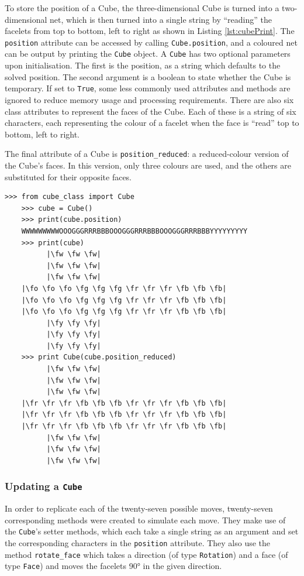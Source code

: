 \documentclass{report}
\newcommand{\fw}{\color{gray}W }
\newcommand{\fo}{\color{orange}O }
\newcommand{\fg}{\color{green}G }
\newcommand{\fr}{\color{red}R }
\newcommand{\fb}{\color{blue}B }
\newcommand{\fy}{\color{yellow}Y }
\begin{document}
    To store the position of a Cube, the three-dimensional Cube is turned into a two-dimensional net, which is then turned into a single string by \enquote{reading} the facelets from top to bottom, left to right as shown in Listing \ref{lst:cubePrint}. The \lstinline|position| attribute can be accessed by calling \lstinline|Cube.position|, and a coloured net can be output by printing the \lstinline|Cube| object. A \lstinline|Cube| has two optional parameters upon initialisation. The first is the position, as a string which defaults to the solved position. The second argument is a boolean to state whether the Cube is temporary. If set to \lstinline|True|, some less commonly used attributes and methods are ignored to reduce memory usage and processing requirements. There are also six class attributes to represent the faces of the Cube. Each of these is a string of six characters, each representing the colour of a facelet when the face is \enquote{read} top to bottom, left to right.
    
    The final attribute of a Cube is \lstinline|position_reduced|: a reduced-colour version of the Cube's faces. In this version, only three colours are used, and the others are substituted for their opposite faces.
    
	\begin{lstlisting}[caption={The two different ways of accessing a Cube's position}, label={lst:cubePrint}]
    >>> from cube_class import Cube
    >>> cube = Cube()
    >>> print(cube.position)
    WWWWWWWWWOOOGGGRRRBBBOOOGGGRRRBBBOOOGGGRRRBBBYYYYYYYYY
    >>> print(cube)
          |\fw \fw \fw|
          |\fw \fw \fw|
          |\fw \fw \fw|
    |\fo \fo \fo \fg \fg \fg \fr \fr \fr \fb \fb \fb|
    |\fo \fo \fo \fg \fg \fg \fr \fr \fr \fb \fb \fb|
    |\fo \fo \fo \fg \fg \fg \fr \fr \fr \fb \fb \fb|
          |\fy \fy \fy|
          |\fy \fy \fy|
          |\fy \fy \fy|
	>>> print Cube(cube.position_reduced)
	      |\fw \fw \fw|
	      |\fw \fw \fw|
	      |\fw \fw \fw|
	|\fr \fr \fr \fb \fb \fb \fr \fr \fr \fb \fb \fb|
	|\fr \fr \fr \fb \fb \fb \fr \fr \fr \fb \fb \fb|
	|\fr \fr \fr \fb \fb \fb \fr \fr \fr \fb \fb \fb|
	      |\fw \fw \fw|
	      |\fw \fw \fw|
	      |\fw \fw \fw|\end{lstlisting}
    
    \subsubsection{Updating a \lstinline|Cube|}
    
    In order to replicate each of the twenty-seven possible moves, twenty-seven corresponding methods were created to simulate each move. They make use of the \lstinline|Cube|'s setter methods, which each take a single string as an argument and set the corresponding characters in the \lstinline|position| attribute. They also use the method \lstinline|rotate_face| which takes a direction (of type \lstinline|Rotation|) and a face (of type \lstinline|Face|) and moves the facelets \ang{90} in the given direction.
    
\end{document}
